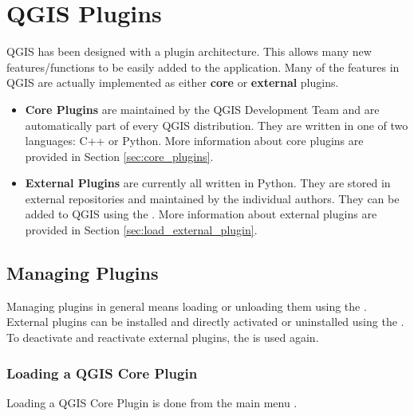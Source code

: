 
\chapter{QGIS Plugins}\label{sec:plugins}

\updatedisclaimer

QGIS has been designed with a plugin architecture.
This allows many new features/functions to be easily added to the application.
Many of the features in QGIS are actually implemented as either \textbf{core}
or \textbf{external} plugins.

\begin{itemize}[label=--]
\item \textbf{Core Plugins} are maintained by the QGIS Development
Team and are automatically part of every QGIS distribution.
They are written in one of two languages: C++ or Python.
More information about core plugins are provided in Section \ref{sec:core_plugins}.
\item \textbf{External Plugins} are currently all written in Python.
They are stored in external repositories and maintained by the individual authors.
They can be added to QGIS using the .
More information about external plugins are provided in Section \ref{sec:load_external_plugin}.
\end{itemize}

\section{Managing Plugins}\label{sec:managing_plugins}

Managing plugins in general means loading or unloading them using
the . External plugins can be installed and
directly activated or uninstalled using the . To deactivate and reactivate external plugins, the
 is used again.

\subsection{Loading a QGIS Core Plugin}\label{sec:load_core_plugin}

Loading a QGIS Core Plugin is done from the main menu 
\arrow {}.

